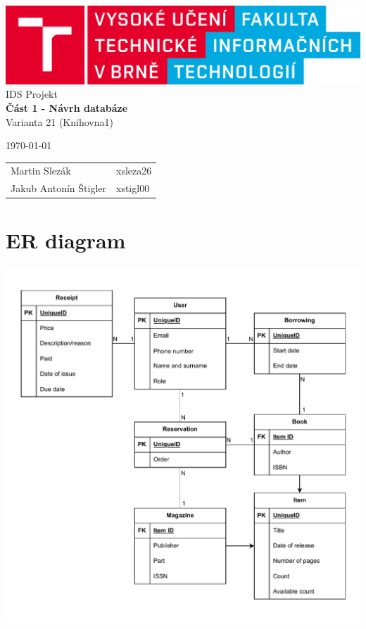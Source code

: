 \documentclass{article}
\begin{document}
\begin{titlepage}
    \begin{center}
        \includegraphics[width=1\textwidth]{assets/FIT_logo.png} \\
        \Huge{IDS Projekt} \\
        \Large{\textbf{Část 1 - Návrh databáze}} \\
        \large{Varianta 21 (Knihovna1)}
    \end{center}
    \vfill
    {
        \large \today \hfill
        \begin{tabular}{l l}
            Martin Slezák          & \quad xsleza26 \\
            Jakub Antonín Štigler  & \quad xstigl00 \\
        \end{tabular}
    }
\end{titlepage}

\section*{ER diagram}

\includegraphics*[width=1\textwidth]{assets/er.pdf}
\end{document}
